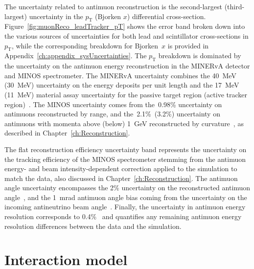 The uncertainty related to antimuon reconstruction is the second-largest (third-largest) uncertainty in the  $p_{\text{T}}$ (Bjorken $x$) differential cross-section.\enlargethispage{1.5\baselineskip} Figure~\ref{fig:muonReco_leadTracker_pT} shows the error band broken down into the various sources of uncertainties for both lead and scintillator cross-sections in $p_{\text{T}}$, while the corresponding breakdown for Bjorken~$x$ is provided in Appendix~\ref{ch:appendix_sysUncertainties}. The $p_{\text{T}}$ breakdown is dominated by the uncertainty on the antimuon energy reconstruction in the MINERvA detector and MINOS spectrometer. The MINERvA uncertainty combines the 40~MeV (30~MeV) uncertainty on the energy deposits per unit length and the  17~MeV (11~MeV) material assay uncertainty for the passive target region (active tracker region)~\cite{Tice_PhysRevLett.112.231801}. The MINOS uncertainty comes from the~0.98\% uncertainty on antimuons reconstructed by range, and the~2.1\%~(3.2\%) uncertainty on antimuons with momenta above (below) 1~GeV reconstructed by curvature~\cite{Aliaga_2014}, as described in Chapter~\ref{ch:Reconstruction}.

The flat reconstruction efficiency uncertainty band represents the uncertainty on the tracking efficiency of the MINOS spectrometer stemming from the antimuon energy- and beam intensity-dependent correction applied to the simulation to match the data, also discussed in Chapter~\ref{ch:Reconstruction}. The antimuon angle uncertainty encompasses the 2\% uncertainty on the reconstructed antimuon angle~\cite{Ziemer:2012ota}, and the 1~mrad antimuon angle bias coming from the uncertainty on the incoming antineutrino beam angle~\cite{Valencia-Rodriguez:2016vkf}. Finally, the uncertainty in antimuon energy resolution corresponds to 0.4\%~\cite{Bashyal:2021tzd} and quantifies any remaining antimuon energy resolution differences between the data and the simulation.




\section{Interaction model}

